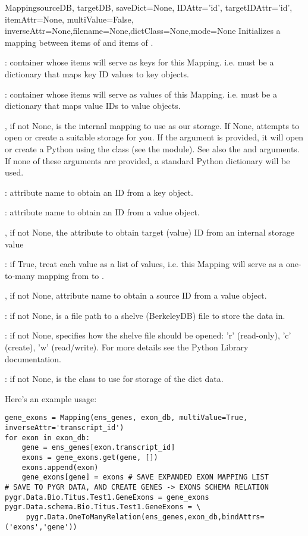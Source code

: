 \documentclass{howto}
\begin{document}
\begin{funcdesc}{Mapping}{sourceDB, targetDB, saveDict=None, IDAttr='id', targetIDAttr='id', itemAttr=None, multiValue=False, inverseAttr=None,filename=None,dictClass=None,mode=None}
  Initializes a mapping between items of  and items of .

  : container whose items will serve as keys for this Mapping.
   i.e.  must be a dictionary that maps key ID values to key objects.

  : container whose items will serve as values of this Mapping.
  i.e.  must be a dictionary that maps value IDs to value objects.

  , if not None, is the internal mapping to use as our storage.
  If None, attempts to open or create a suitable storage for you.  If the
   argument is provided, it will open or create a Python 
  using the  class (see the  module).
  See also the  and  arguments.
  If none of these arguments are provided, a standard Python dictionary will be used.

  : attribute name to obtain an ID from a key object.

  : attribute name to obtain an ID from a value object.

  , if not None, the attribute to obtain target (value) ID
  from an internal storage value

  : if True, treat each value as a list of values, i.e. this
  Mapping will serve as a one-to-many mapping from  to .

  , if not None, attribute name to obtain a source ID from
  a value object.

  : if not None, is a file path to a shelve (BerkeleyDB) file to
  store the data in.

  : if not None, specifies how the shelve file should be opened:
  'r' (read-only), 'c' (create), 'w' (read/write).  For more details see the
  Python Library  documentation.
   
  : if not None, is the class to use for storage of the dict data.
\end{funcdesc}

Here's an example usage:
\begin{verbatim}
gene_exons = Mapping(ens_genes, exon_db, multiValue=True, inverseAttr='transcript_id')
for exon in exon_db:
    gene = ens_genes[exon.transcript_id]
    exons = gene_exons.get(gene, [])
    exons.append(exon)
    gene_exons[gene] = exons # SAVE EXPANDED EXON MAPPING LIST
# SAVE TO PYGR DATA, AND CREATE GENES -> EXONS SCHEMA RELATION
pygr.Data.Bio.Titus.Test1.GeneExons = gene_exons
pygr.Data.schema.Bio.Titus.Test1.GeneExons = \
     pygr.Data.OneToManyRelation(ens_genes,exon_db,bindAttrs=('exons','gene'))
\end{verbatim}
\end{document}
